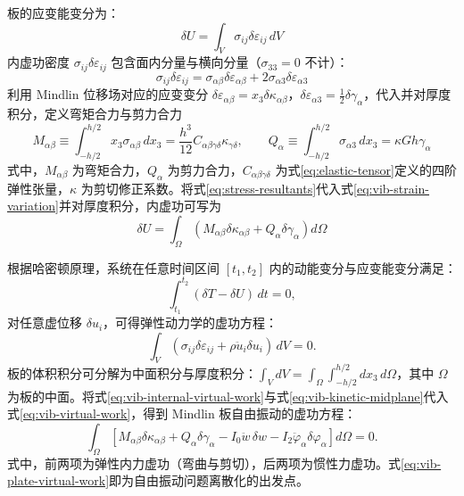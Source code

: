 板的应变能变分为：
\begin{equation}
\delta U = \int_V \sigma_{ij} \delta\varepsilon_{ij}\, dV
\label{eq:vib-strain-variation}
\end{equation}
内虚功密度 $\sigma_{ij}\delta\varepsilon_{ij}$ 包含面内分量与横向分量（$\sigma_{33}=0$ 不计）：
\begin{equation}
\sigma_{ij}\delta\varepsilon_{ij} = \sigma_{\alpha\beta}\delta\varepsilon_{\alpha\beta} + 2\sigma_{\alpha 3}\delta\varepsilon_{\alpha 3}
\label{eq:virtual-work-density}
\end{equation}
利用 Mindlin 位移场对应的应变变分 $\delta\varepsilon_{\alpha\beta} = x_3\delta\kappa_{\alpha\beta}$，$\delta\varepsilon_{\alpha 3} = \frac{1}{2}\delta\gamma_\alpha$，代入并对厚度积分，定义弯矩合力与剪力合力
\begin{equation}
M_{\alpha\beta} \equiv \int_{-h/2}^{h/2} x_3 \sigma_{\alpha\beta}\, dx_3 = \frac{h^3}{12} C_{\alpha\beta\gamma\delta}\kappa_{\gamma\delta}, \qquad Q_\alpha \equiv \int_{-h/2}^{h/2} \sigma_{\alpha 3}\, dx_3 = \kappa G h \gamma_\alpha
\label{eq:stress-resultants}
\end{equation}
式中，$M_{\alpha\beta}$ 为弯矩合力，$Q_\alpha$ 为剪力合力，$C_{\alpha\beta\gamma\delta}$ 为式\eqref{eq:elastic-tensor}定义的四阶弹性张量，$\kappa$ 为剪切修正系数。将式\eqref{eq:stress-resultants}代入式\eqref{eq:vib-strain-variation}并对厚度积分，内虚功可写为
\begin{equation}
\delta U = \int_\Omega \left(M_{\alpha\beta}\delta\kappa_{\alpha\beta} + Q_\alpha \delta\gamma_\alpha\right) d\Omega
\label{eq:vib-internal-virtual-work}
\end{equation}

根据哈密顿原理，系统在任意时间区间 $[t_1, t_2]$ 内的动能变分与应变能变分满足：
\begin{equation}
\int_{t_1}^{t_2} (\delta T - \delta U)\, dt = 0,
\label{eq:hamilton-principle}
\end{equation}
对任意虚位移 $\delta u_i$，可得弹性动力学的虚功方程：
\begin{equation}
\int_V (\sigma_{ij}\delta\varepsilon_{ij} + \rho \ddot{u}_i \delta u_i)\, dV = 0.
\label{eq:vib-virtual-work}
\end{equation}
板的体积积分可分解为中面积分与厚度积分：$\int_V dV = \int_\Omega \int_{-h/2}^{h/2} dx_3\, d\Omega$，其中 $\Omega$ 为板的中面。将式\eqref{eq:vib-internal-virtual-work}与式\eqref{eq:vib-kinetic-midplane}代入式\eqref{eq:vib-virtual-work}，得到 Mindlin 板自由振动的虚功方程：
\begin{equation}
\int_\Omega \left[M_{\alpha\beta}\delta\kappa_{\alpha\beta} + Q_\alpha \delta\gamma_\alpha - I_0 \ddot{w}\,\delta w - I_2 \ddot{\varphi}_\alpha \delta \varphi_\alpha\right] d\Omega = 0.
\label{eq:vib-plate-virtual-work}
\end{equation}
式中，前两项为弹性内力虚功（弯曲与剪切），后两项为惯性力虚功。式\eqref{eq:vib-plate-virtual-work}即为自由振动问题离散化的出发点。

